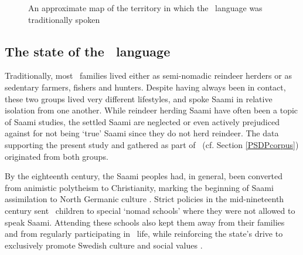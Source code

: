 \setlength\fboxsep{0pt}
\setlength\fboxrule{1pt}
\begin{figure}
\centering
{}
\parbox{150mm}{\caption{An approximate map of the territory in which the \PS\ language was traditionally spoken\label{piteTerritory}}}%
\end{figure}%

\FloatBarrier

\subsection{The state of the \PS\ language}\label{sociolinguistics}
Traditionally, most \PS\ families lived either as semi-nomadic reindeer herders or as sedentary farmers, fishers and hunters. Despite having always been in contact, these two groups lived very different lifestyles, and spoke Saami in relative isolation from one another. While reindeer herding Saami have often been a topic of Saami studies, the settled Saami are neglected or even actively prejudiced against for not being ‘true’ Saami since they do not herd reindeer. The data supporting the present study and gathered as part of \PSDP\ (cf. Section \ref{PSDPcorpus}) originated from both groups.

By the eighteenth century, the Saami peoples had, in general, been converted from animistic polytheism to Christianity, marking the beginning of Saami assimilation to North Germanic culture \citep[cf.][]{Pulkkinen2005}. %
Strict policies in the mid-nineteenth century sent \PS\ children to special ‘nomad schools’ where they were not allowed to speak Saami. Attending these schools also kept them away from their families and from regularly participating in \PS\ life, while reinforcing the state’s drive to exclusively promote Swedish culture and social values \citep[cf.][]{ValijarviWilbur2011}. 

